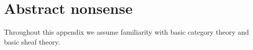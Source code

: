 \chapter{Abstract nonsense}\label{app:abstract-nonsense}
Throughout this appendix we assume familiarity with basic category theory and basic sheaf theory.
	
